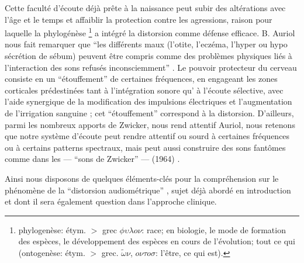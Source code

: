 Cette faculté d'écoute déjà prête à la naissance peut subir des
altérations avec l'âge et
le temps et affaiblir la protection contre les agressions, raison pour
laquelle la phylogénèse \footnote{ phylogenèse: étym. $>$ grec $\phi
  \upsilon \lambda o \nu $: race; en biologie, le mode de formation des espèces, le développement
  des espèces en cours de l'évolution; tout ce qui (ontogenèse:
  étym. $>$ grec. $\tilde{\omega}\nu$, $o \nu \tau o
  \sigma$: l'être,
ce qui est).}  a intégré la distorsion comme défense
efficace.
B. Auriol nous fait
remarquer que
\enquote {les différents maux (l'otite, l'eczéma, l'hyper
ou hypo sécrétion de sébum) peuvent être compris comme des problèmes physiques liés à l'interaction des sons refusés
inconsciemment} \autocite [19--20]  {auriol:cle}.
Le pouvoir protecteur du cerveau consiste en un  ``étouffement'' de
certaines fréquences,  en engageant les zones corticales prédestinées
tant à
l'intégration sonore qu' à l'écoute sélective,  avec l'aide synergique de la
modification des impulsions électriques et l'augmentation de
l'irrigation sanguine \autocite [14] {auriol:cle};
cet ``étouffement'' correspond à la distorsion.
D'ailleurs,  parmi les nombreux apports de Zwicker, nous rend attentif Auriol,  nous retenons que 
notre 
système d'écoute peut rendre
attentif ou sourd à certaines fréquences ou à certains patterns
spectraux, mais peut aussi construire des sons fantômes comme dans les --- ``sons de 
Zwicker'' --- (1964) \autocite%
 {auriol:cle}.


Ainsi nous disposons de quelques éléments-clés pour la compréhension
sur le phénomène de la ``distorsion audiométrique'' \autocite
{auriol:cle}, sujet déjà abordé en introduction et dont il sera également question dans l'approche
clinique.



